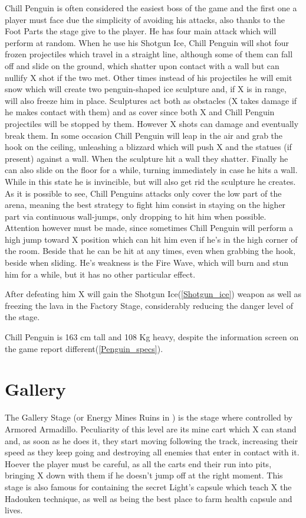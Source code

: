 Chill Penguin is often considered the easiest boss of the game and the first one a player must face due the simplicity of avoiding his attacks, also thanks to the Foot Parts the stage give to the player. He has four main attack which will perform at random\cite{wiki:Chill_Penguin}. When he use his Shotgun Ice, Chill Penguin will shot four frozen projectiles which travel in a straight line, although some of them can fall off and slide on the ground, which shatter upon contact with a wall but can nullify X shot if the two met. Other times instead of his projectiles he will emit snow which will create two penguin-shaped ice sculpture and, if X is in range, will also freeze him in place. Sculptures act both as obstacles (X takes damage if he makes contact with them) and as cover since both X and Chill Penguin projectiles will be stopped by them. However X shots can damage and eventually break them. In some occasion Chill Penguin will leap in the air and grab the hook on the ceiling, unleashing a blizzard which will push X and the statues (if present) against a wall. When the sculpture hit a wall they shatter. Finally he can also slide on the floor for a while, turning immediately in case he hits a wall. While in this state he is invincible, but will also get rid the sculpture he creates.  As it is possible to see, Chill Penguins attacks only cover the low part of the arena, meaning the best strategy to fight him consist in staying on the higher part via continuous wall-jumps, only dropping to hit him when possible. Attention however must be made, since sometimes Chill Penguin will perform a high jump toward X position which can hit him even if he's  in the high corner of the room. Beside that he can be hit at any times, even when grabbing the hook, beside when sliding. He's weakness is the Fire Wave, which will burn and stun him for a while, but it has no other particular effect.

After defeating him X will gain the Shotgun Ice(\ref{Shotgun_ice}) weapon as well as freezing the lava in the Factory Stage, considerably reducing the danger level of the stage.

Chill Penguin is 163 cm tall and 108 Kg heavy, despite the information screen on the game report different(\ref{Penguin_specs}).

\section{Gallery}
The Gallery Stage (or Energy Mines Ruins in \mhx) is the stage where controlled by Armored Armadillo. Peculiarity of this level are its mine cart which X can stand and, as soon as he does it, they start moving following the track, increasing their speed as they keep going and destroying all enemies that enter in contact with it. Hoever the player must be careful, as all the carts end their run into pits, bringing X down with them if he doesn't jump off at the right moment. This stage is also famous for containing the secret Light's capsule which teach X the Hadouken technique, as well as being the best place to farm health capsule and lives.

